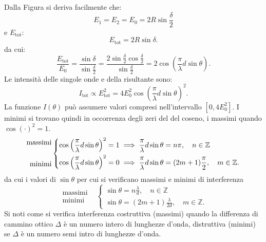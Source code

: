 \documentclass[a4paper,11pt]{report}
\begin{document}
\noindent
Dalla Figura si deriva facilmente che:
\begin{equation}
    E_1 = E_2 = E_0 = 2R \sin\frac{\delta}{2}
\end{equation}
e $E_{\text{tot}}$:
\begin{equation}
    E_{\text{tot}} = 2R\sin\delta.
\end{equation}
da cui:
\begin{equation}
    \frac{E_{\text{tot}}}{E_{0}} = \frac{\sin\delta}{\sin\frac{\delta}{2}} = \frac{2\sin\frac{\delta}{2}\cos\frac{\delta}{2}}{\sin\frac{\delta}{2}} = 2\cos \left(\frac{\pi}{\lambda} d \sin\theta\right).
\end{equation}
Le intensità delle singole onde e della risultante sono: 
\begin{equation}
    I_{\text{tot}} \propto E_{\text{tot}}^2 = 4E_0^2\cos \left(\frac{\pi}{\lambda} d \sin\theta\right)^2.
\end{equation}
La funzione $I(\theta)$ può assumere valori compresi nell'intervallo $[0, 4E_0^2]$. I minimi si trovano quindi in occorrenza degli zeri del del coseno, i massimi quando $\cos(\cdot)^2 = 1$.
\begin{equation}
\begin{aligned}
\text{massimi}& \\
\\
\text{minimi} &
\end{aligned}
    \begin{dcases}
    \cos \left(\frac{\pi}{\lambda} d \sin\theta\right)^2 = 1 \implies \frac{\pi}{\lambda} d \sin\theta = n\pi, \quad n \in \mathbb{Z} \\
    \cos \left(\frac{\pi}{\lambda} d \sin\theta\right)^2 = 0 \implies \frac{\pi}{\lambda} d \sin\theta = (2m+1)\frac{\pi}{2}, \quad m \in \mathbb{Z}.
    \end{dcases}
\end{equation}
da cui i valori di $\sin\theta$ per cui si verificano massimi e minimi di interferenza
\begin{equation}
\begin{aligned}
\text{massimi}& \\
\text{minimi} &
\end{aligned}
    \begin{cases}
      \sin\theta = n\frac{\lambda}{d}, \quad n \in \mathbb{Z} \\
      \sin\theta = (2m+1)\frac{\lambda}{2d}, \quad m \in \mathbb{Z}.
    \end{cases}
\end{equation}
Si noti come si verifica interferenza costruttiva (massimi) quando la differenza di cammino ottico $\Delta$ è un numero intero di lunghezze d'onda, distruttiva (minimi) se $\Delta$ è un numero semi intro di lunghezze d'onda.
\end{document}
